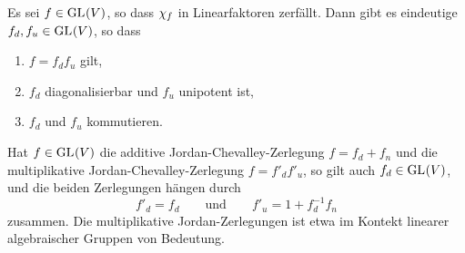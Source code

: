 \begin{theorem*}
  Es sei $f \in \operatorname{GL}_{}(V)$, so dass $\chi_{f}$ in Linearfaktoren zerfällt.
  Dann gibt es eindeutige $f_d, f_u \in \operatorname{GL}_{}(V)$, so dass
  \begin{enumerate}
    \item
      $f = f_d f_u$ gilt,
    \item
      $f_d$ diagonalisierbar und $f_u$ unipotent ist,
    \item
      $f_d$ und $f_u$ kommutieren.
  \end{enumerate}
\end{theorem*}

Hat $f \in \operatorname{GL}_{}(V)$ die additive Jordan-Chevalley-Zerlegung $f = f_d + f_n$ und die multiplikative Jordan-Chevalley-Zerlegung $f = f'_d f'_u$, so gilt auch $f_d \in \operatorname{GL}_{}(V)$, und die beiden Zerlegungen hängen durch
\[
  f'_d = f_d
  \qquad\text{und}\qquad
  f'_u = 1 + f_d^{-1} f_n
\]
zusammen.
Die multiplikative Jordan-Zerlegungen ist etwa im Kontekt linearer algebraischer Gruppen von Bedeutung.
